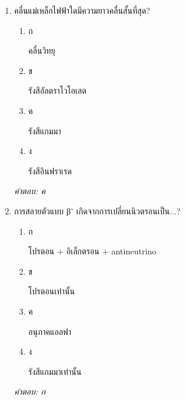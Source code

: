\documentclass[12pt]{article}
\begin{document}
\begin{enumerate}[label=\arabic*., itemsep=0.5\baselineskip, topsep=0.5\baselineskip, leftmargin=*]
\item คลื่นแม่เหล็กไฟฟ้าใดมีความยาวคลื่นสั้นที่สุด?
\begin{enumerate}[label=\alph*)., itemsep=0.3\baselineskip, topsep=0.3\baselineskip]
\item ก\ 
\begin{minipage}[t]{0.9\linewidth}
\raggedright คลื่นวิทยุ
\end{minipage}
\item ข\ 
\begin{minipage}[t]{0.9\linewidth}
\raggedright รังสีอัลตราไวโอเลต
\end{minipage}
\item ค\ 
\begin{minipage}[t]{0.9\linewidth}
\raggedright รังสีแกมมา
\end{minipage}
\item ง\ 
\begin{minipage}[t]{0.9\linewidth}
\raggedright รังสีอินฟราเรด
\end{minipage}
\end{enumerate}
\vspace{-0.3\baselineskip}
\begin{small}
\textit{คำตอบ: ค}
\end{small}

\item การสลายตัวแบบ β⁻ เกิดจากการเปลี่ยนนิวตรอนเป็น...?
\begin{enumerate}[label=\alph*)., itemsep=0.3\baselineskip, topsep=0.3\baselineskip]
\item ก\ 
\begin{minipage}[t]{0.9\linewidth}
\raggedright โปรตอน + อิเล็กตรอน + antineutrino
\end{minipage}
\item ข\ 
\begin{minipage}[t]{0.9\linewidth}
\raggedright โปรตอนเท่านั้น
\end{minipage}
\item ค\ 
\begin{minipage}[t]{0.9\linewidth}
\raggedright อนุภาคแอลฟา
\end{minipage}
\item ง\ 
\begin{minipage}[t]{0.9\linewidth}
\raggedright รังสีแกมมาเท่านั้น
\end{minipage}
\end{enumerate}
\vspace{-0.3\baselineskip}
\begin{small}
\textit{คำตอบ: ก}
\end{small}


\end{enumerate}
\end{document}
